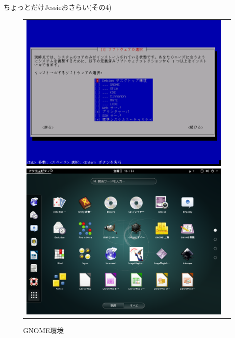 \begin{frame}{ちょっとだけJessieおさらい(その4)}

\begin{figure}[htbp]
\begin{tabular}{cc}
\begin{minipage}{0.5\hsize}
\includegraphics[width=0.8\hsize]{image201509/debian8-inst-03.png}
\caption{テキストインストール}
\end{minipage}
\begin{minipage}{0.5\hsize}
\includegraphics[width=0.8\hsize]{image201509/debian8-gnome.png}
\caption{GNOME環境}
\end{minipage}
\end{tabular}
\end{figure}

\end{frame}


